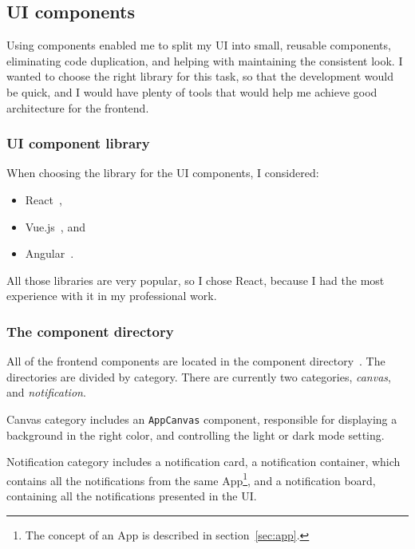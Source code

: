 \subsection{UI components}\label{sec:ui-components}

Using components enabled me to split my UI
into small, reusable components,
eliminating code duplication,
and helping with maintaining the consistent look.
I wanted to choose the right library
for this task,
so that the development would be quick,
and I would have plenty of tools
that would help me achieve
good architecture for the frontend.

\subsubsection{UI component library}\label{sec:ui-component-library}

When choosing the library for the UI components, I considered:

\begin{itemize}
  \item
        React~\cite{oshannessy_react_2022},
  \item
        Vue.js~\cite{you_vuejs_2022}, and
  \item
        Angular~\cite{kalpakas_angular_2022}.
\end{itemize}

All those libraries are very popular,
so I chose React,
because I had the most experience with it in my professional work.

\subsubsection{The component directory}\label{sec:the-component-directory}

All of the frontend components
are located in the component directory~\cite{sewera_notipie_2022-3}.
The directories are divided by category.
There are currently two categories,
\textit{canvas}, and
\textit{notification}.

Canvas category includes
an \texttt{AppCanvas} component,
responsible for displaying
a background in the right color,
and controlling the light or dark mode setting.

Notification category includes
a notification card,
a notification container,
which contains all the notifications
from the same App\footnote{
  The concept of an App is described
  in section~\ref{sec:app}.
}, and a notification board,
containing all the notifications
presented in the UI.

